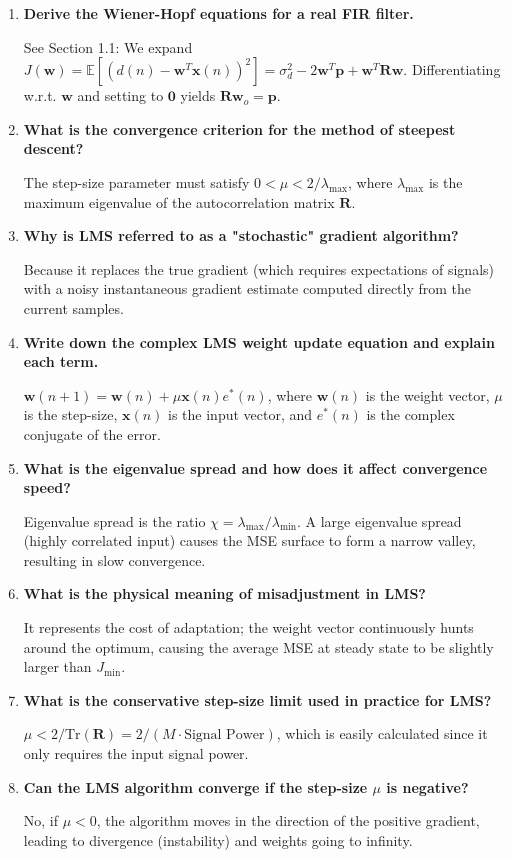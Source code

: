\documentclass[12pt,a4paper]{article}
\newcommand{\Q}[1]{\textbf{#1}\par\noindent\ignorespaces}
\begin{document}
\begin{tcolorbox}[exambox, title={\textbf{Frequently Asked / Viva Questions}}]
\begin{enumerate}[topsep=0pt, label=\textbf{Q\arabic*.}, itemsep=5pt]
  \item \Q{Derive the Wiener-Hopf equations for a real FIR filter.}
    See Section 1.1: We expand $J(\mathbf{w}) = \mathbb{E}[(d(n) - \mathbf{w}^T\mathbf{x}(n))^2] = \sigma_d^2 - 2\mathbf{w}^T\mathbf{p} + \mathbf{w}^T\mathbf{R}\mathbf{w}$. Differentiating w.r.t. $\mathbf{w}$ and setting to $\mathbf{0}$ yields $\mathbf{R}\mathbf{w}_o = \mathbf{p}$.
  \item \Q{What is the convergence criterion for the method of steepest descent?}
    The step-size parameter must satisfy $0 < \mu < 2/\lambda_{\text{max}}$, where $\lambda_{\text{max}}$ is the maximum eigenvalue of the autocorrelation matrix $\mathbf{R}$.
  \item \Q{Why is LMS referred to as a "stochastic" gradient algorithm?}
    Because it replaces the true gradient (which requires expectations of signals) with a noisy instantaneous gradient estimate computed directly from the current samples.
  \item \Q{Write down the complex LMS weight update equation and explain each term.}
    $\mathbf{w}(n+1) = \mathbf{w}(n) + \mu \mathbf{x}(n)e^*(n)$, where $\mathbf{w}(n)$ is the weight vector, $\mu$ is the step-size, $\mathbf{x}(n)$ is the input vector, and $e^*(n)$ is the complex conjugate of the error.
  \item \Q{What is the eigenvalue spread and how does it affect convergence speed?}
    Eigenvalue spread is the ratio $\chi = \lambda_{\text{max}}/\lambda_{\text{min}}$. A large eigenvalue spread (highly correlated input) causes the MSE surface to form a narrow valley, resulting in slow convergence.
  \item \Q{What is the physical meaning of misadjustment in LMS?}
    It represents the cost of adaptation; the weight vector continuously hunts around the optimum, causing the average MSE at steady state to be slightly larger than $J_{\text{min}}$.
  \item \Q{What is the conservative step-size limit used in practice for LMS?}
    $\mu < 2/\text{Tr}(\mathbf{R}) = 2/(M \cdot \text{Signal Power})$, which is easily calculated since it only requires the input signal power.
  \item \Q{Can the LMS algorithm converge if the step-size $\mu$ is negative?}
    No, if $\mu < 0$, the algorithm moves in the direction of the positive gradient, leading to divergence (instability) and weights going to infinity.

\end{enumerate}
\end{tcolorbox}
\end{document}
